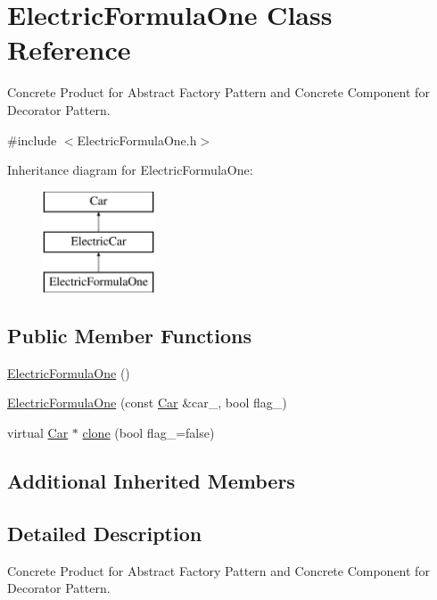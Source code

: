 \hypertarget{class_electric_formula_one}{}\section{Electric\+Formula\+One Class Reference}
\label{class_electric_formula_one}


Concrete Product for Abstract Factory Pattern and Concrete Component for Decorator Pattern.  




{\ttfamily \#include $<$Electric\+Formula\+One.\+h$>$}

Inheritance diagram for Electric\+Formula\+One\+:\begin{figure}[H]
\begin{center}
\leavevmode
\includegraphics[height=3.000000cm]{class_electric_formula_one}
\end{center}
\end{figure}
\subsection*{Public Member Functions}
\begin{DoxyCompactItemize}
\item 
\mbox{\hyperlink{class_electric_formula_one_a4c18ff978aba7c2ce7f6df0bd8c4a8f4}{Electric\+Formula\+One}} ()
\item 
\mbox{\hyperlink{class_electric_formula_one_a5aeecfb047d062d7757f84ddc720e1b0}{Electric\+Formula\+One}} (const \mbox{\hyperlink{class_car}{Car}} \&car\+\_\+, bool flag\+\_\+)
\item 
virtual \mbox{\hyperlink{class_car}{Car}} $\ast$ \mbox{\hyperlink{class_electric_formula_one_ac1649c11b48ceae7a98ccbc0d4727e7c}{clone}} (bool flag\+\_\+=false)
\end{DoxyCompactItemize}
\subsection*{Additional Inherited Members}


\subsection{Detailed Description}
Concrete Product for Abstract Factory Pattern and Concrete Component for Decorator Pattern. 

